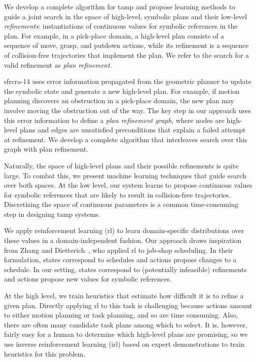 We develop a complete algorithm for {\sc tamp} and
propose learning methods to guide a joint search in the space of
high-level, symbolic plans and their low-level \emph{refinements}:
instantiations of continuous values for symbolic references in the
plan. For example, in a pick-place domain, a high-level plan consists
of a sequence of move, grasp, and putdown actions, while its
refinement is a sequence of collision-free trajectories that implement
the plan. We refer to the search for a valid refinement as \emph{plan
  refinement}.

{\sc sfrcra-14} uses error information propagated from the geometric
planner to update the symbolic state and generate a new high-level
plan.  For example, if motion planning discovers an obstruction in a
pick-place domain, the new plan may involve moving the obstruction out
of the way.  The key step in our approach uses this error information to define a \emph{plan
  refinement graph}, where nodes are high-level plans and edges are
unsatisfied preconditions that explain a failed attempt at
refinement. We develop a complete algorithm that interleaves search
over this graph with plan refinement.

Naturally, the space of high-level plans and their possible refinements is
quite large. To combat this, we present machine learning techniques
that guide search over both spaces. At the low
level, our system learns to propose continuous values for symbolic
references that are likely to result in collision-free
trajectories. Discretizing the space of continuous parameters is a
common time-consuming step in designing {\sc tamp} systems.

We apply reinforcement learning ({\sc rl}) to learn domain-specific
distributions over these values in a domain-independent fashion.  Our
approach draws inspiration from Zhang and
Dietterich~\cite{JobShopSched}, who applied {\sc rl} to job-shop
scheduling. In their formulation, states correspond to schedules and
actions propose changes to a schedule. In our setting, states
correspond to (potentially infeasible) refinements and actions propose
new values for symbolic references.

At the high level, we train heuristics that estimate how difficult it
is to refine a given plan. Directly applying {\sc rl} to
this task is challenging because actions amount to either motion
planning or task planning, and so are time consuming. Also, there are often
many candidate task plans among which to select. It is,
however, fairly easy for a human to determine which high-level plans
are promising, so we use inverse reinforcement learning ({\sc irl}) based on
expert demonstrations to train heuristics for this problem.

